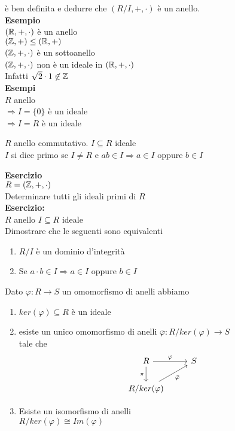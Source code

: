 \documentclass[12px]{article}
\begin{document}
	è ben definita e dedurre che $(R/I,+,\cdot)$ è un anello.\\
	\textbf{Esempio}\\
	$(\mathbb{R},+,\cdot)$ è un anello\\
	 $(\mathbb{Z},+) \leq (\mathbb{R},+)$\\
	  $(\mathbb{Z},+,\cdot)$ è un sottoanello\\
	  $(\mathbb{Z}, +,\cdot)$ non è un ideale in  $(\mathbb{R},+,\cdot)$\\
	  Infatti  $\sqrt 2 \cdot 1\not\in \mathbb{Z}$\\
	   \textbf{Esempi}\\
	   $R$ anello\\
	   $ \Rightarrow  I=\{0\}$ è un ideale\\
	   $ \Rightarrow I=R$ è un ideale\\
	   \begin{defi}
	   	$R$ anello commutativo. $I\subseteq R$ ideale\\
		$I$ si dice primo se $I\neq R$ e $ab\in I \Rightarrow a\in I$ oppure $b\in I$
	   \end{defi}
	   \textbf{Esercizio}\\
	   $R = (\mathbb{Z}, + , \cdot)$\\
	   Determinare tutti gli ideali primi di $R$\\
	   \textbf{Esercizio:}\\
	   $R$ anello $I\subseteq R$ ideale\\
	   Dimostrare che le seguenti sono equivalenti
	    \begin{enumerate}
		    \item $R/I$ è un dominio d'integrità
		    \item  Se $a\cdot b\in I \Rightarrow a\in I$ oppure $b\in I$
	   \end{enumerate}
	   \begin{teo}
	   	Dato $\varphi: R \rightarrow S$ un omomorfismo di anelli abbiamo
		\begin{enumerate}
			\item $ker (\varphi)\subseteq R$ è un ideale
			\item esiste un unico omomorfismo di anelli $\bar \varphi : R/ker(\varphi) \rightarrow S$\\
				tale che  
				\[
\begin{tikzcd}
R \arrow[r, "\varphi"] \arrow[d, "\pi"'] & S  \\
R/ker(\varphi)\arrow[ur, "\bar\varphi"']
\end{tikzcd}
\]

			\item Esiste un isomorfismo di anelli\\
				$R/ker(\varphi) \cong Im(\varphi)$
		\end{enumerate}
	   \end{teo}
\end{document}
